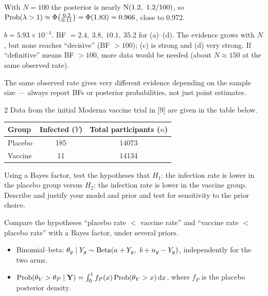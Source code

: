 \documentclass[11pt]{article}
\begin{document}
\begin{sanity}
With $N=100$ the posterior is nearly $\dist N(1.2,\ 1.2/100)$, so $\mathrm{Prob}(\lambda>1)\approx\Phi\big(\frac{0.2}{0.11}\big)=\Phi(1.83)=0.966$, close to 0.972. \checkmark
\end{sanity}

\begin{answer}
$b=5.93\times10^{-4}$. BF $=2.4,\ 3.8,\ 10.1,\ 35.2$ for (a)--(d). The evidence grows with $N$, but none reaches ``decisive'' (BF $>100$); (c) is strong and (d) very strong. If ``definitive'' means BF $>100$, more data would be needed (about $N\approx150$ at the same observed rate).
\end{answer}

\begin{takeaway}
The same observed rate gives very different evidence depending on the sample size --- always report BFs or posterior probabilities, not just point estimates.
\end{takeaway}


\begin{problem}{2}
Data from the initial Moderna vaccine trial in [9] are given in the table below.
\begin{center}
\begin{tabular}{lcc}\toprule
Group & Infected ($Y$) & Total participants ($n$)\\\midrule
Placebo & 185 & 14073\\
Vaccine & 11 & 14134\\\bottomrule
\end{tabular}
\end{center}
Using a Bayes factor, test the hypotheses that $H_1$: the infection rate is lower in the placebo group versus $H_2$: the infection rate is lower in the vaccine group. Describe and justify your model and prior and test for sensitivity to the prior choice.
\end{problem}

\begin{restate}
Compare the hypotheses ``placebo rate $<$ vaccine rate'' and ``vaccine rate $<$ placebo rate'' with a Bayes factor, under several priors.
\end{restate}

\begin{recall}
\begin{itemize}
\item Binomial--beta: $\theta_g\mid Y_g\sim\mathrm{Beta}(a+Y_g,\ b+n_g-Y_g)$, independently for the two arms.
\item $\mathrm{Prob}(\theta_V>\theta_P\mid\mathbf Y)=\int_0^1 f_P(x)\,\mathrm{Prob}(\theta_V>x)\,\mathrm{d} x$, where $f_P$ is the placebo posterior density.
\end{itemize}
\end{recall}
\end{document}
